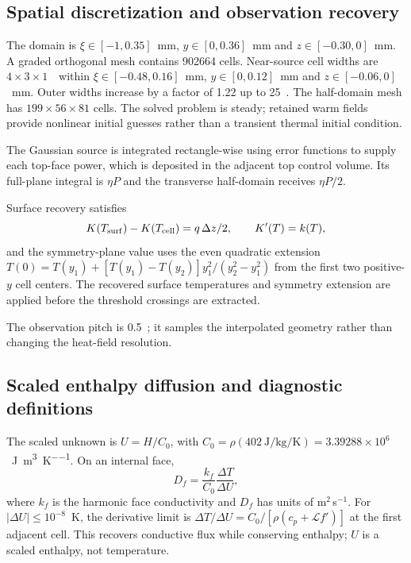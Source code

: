 \subsection{Spatial discretization and observation recovery}
The domain is $\xi\in[-1,0.35]$~mm, $y\in[0,0.36]$~mm and $z\in[-0.30,0]$~mm. A graded orthogonal mesh contains 902664 cells. Near-source cell widths are $4\times3\times1$~\um\ within $\xi\in[-0.48,0.16]$~mm, $y\in[0,0.12]$~mm and $z\in[-0.06,0]$~mm. Outer widths increase by a factor of 1.22 up to 25~\um. The half-domain mesh has $199\times56\times81$ cells. The solved problem is steady; retained warm fields provide nonlinear initial guesses rather than a transient thermal initial condition.

The Gaussian source is integrated rectangle-wise using error functions to supply each top-face power, which is deposited in the adjacent top control volume. Its full-plane integral is $\eta P$ and the transverse half-domain receives $\eta P/2$.

Surface recovery satisfies
\begin{equation}
 K(T_{\rm surf})-K(T_{\rm cell})=q\,\Delta z/2,\qquad K'(T)=k(T),
\end{equation}
and the symmetry-plane value uses the even quadratic extension $T(0)=T(y_1)+[T(y_1)-T(y_2)]y_1^2/(y_2^2-y_1^2)$ from the first two positive-$y$ cell centers. The recovered surface temperatures and symmetry extension are applied before the threshold crossings are extracted.

The observation pitch is 0.5~\um; it samples the interpolated geometry rather than changing the heat-field resolution.

\subsection{Scaled enthalpy diffusion and diagnostic definitions}
The scaled unknown is $U=H/C_0$, with $C_0=\rho(402~\si{\joule\per\kilogram\per\kelvin})=3.39288\times10^6$~\si{\joule\per\cubic\metre\per\kelvin}. On an internal face,
\begin{equation}
 D_f=\frac{k_f}{C_0}\frac{\Delta T}{\Delta U},
 \label{eq:face}
\end{equation}
where $k_f$ is the harmonic face conductivity and $D_f$ has units of m$^2$\,s$^{-1}$. For $|\Delta U|\leq10^{-8}$~K, the derivative limit is $\Delta T/\Delta U=C_0/[\rho(c_p+\mathcal L f')]$ at the first adjacent cell. This recovers conductive flux while conserving enthalpy; $U$ is a scaled enthalpy, not temperature.

